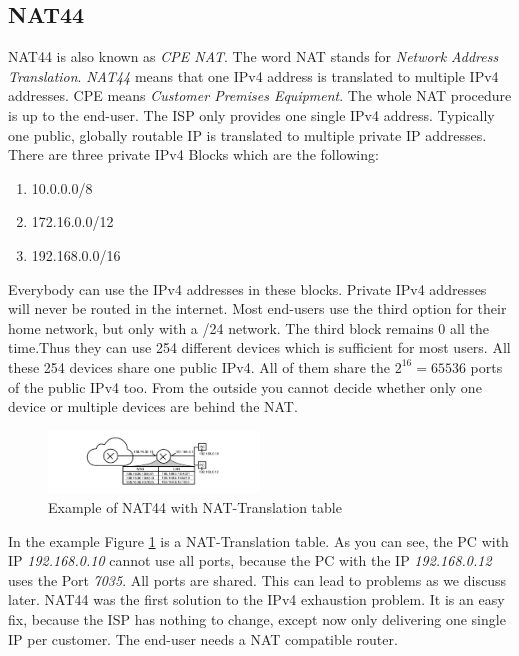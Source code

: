 \documentclass[format=sigconf, natbib=true, nonacm=true]{acmart}
\begin{document}
    \subsection{NAT44}
    NAT44 is also known as \textit{CPE NAT}. The word NAT stands for \textit{Network Address Translation}. \textit{NAT44} means that one IPv4 address is translated to multiple IPv4 addresses. CPE means \textit{Customer Premises Equipment}. The whole NAT procedure is up to the end-user. The ISP only provides one single IPv4 address. Typically one public, globally routable IP is translated to multiple private IP addresses. There are three private IPv4 Blocks which are the following:
    \begin{enumerate}
        \item 10.0.0.0/8
        \item 172.16.0.0/12
        \item 192.168.0.0/16
    \end{enumerate}
    Everybody can use the IPv4 addresses in these blocks. Private IPv4 addresses will never be routed in the internet. Most end-users use the third option for their home network, but only with a /24 network. The third block remains 0 all the time.Thus they can use 254 different devices which is sufficient for most users. All these 254 devices share one public IPv4. All of them share the $2^{16} = 65536$ ports of the public IPv4 too. From the outside you cannot decide whether only one device or multiple devices are behind the NAT.
    \begin{figure}
        \centering
        \includegraphics[width=0.5\textwidth]{images/nat_44.png}
        \caption{Example of NAT44 with NAT-Translation table}
        \label{fig:nat_44}
    \end{figure}
    In the example Figure \ref{fig:nat_44} is a NAT-Translation table. As you can see, the PC with IP \textit{192.168.0.10} cannot use all ports, because the PC with the IP \textit{192.168.0.12} uses the Port \textit{7035}. All ports are shared. This can lead to problems as we discuss later. NAT44 was the first solution to the IPv4 exhaustion problem. It is an easy fix, because the ISP has nothing to change, except now only delivering one single IP per customer. The end-user needs a NAT compatible router.
\end{document}
